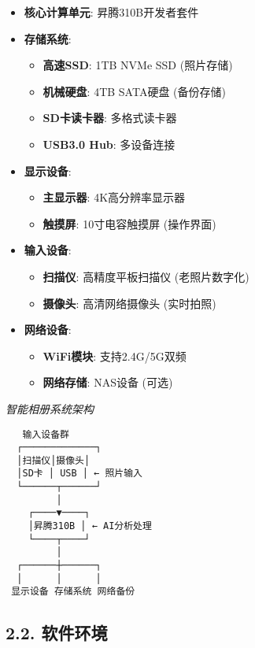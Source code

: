 \begin{itemize}
\tightlist
\item
  \textbf{核心计算单元}: 昇腾310B开发者套件
\item
  \textbf{存储系统}:

  \begin{itemize}
  \tightlist
  \item
    \textbf{高速SSD}: 1TB NVMe SSD (照片存储)
  \item
    \textbf{机械硬盘}: 4TB SATA硬盘 (备份存储)
  \item
    \textbf{SD卡读卡器}: 多格式读卡器
  \item
    \textbf{USB3.0 Hub}: 多设备连接
  \end{itemize}
\item
  \textbf{显示设备}:

  \begin{itemize}
  \tightlist
  \item
    \textbf{主显示器}: 4K高分辨率显示器
  \item
    \textbf{触摸屏}: 10寸电容触摸屏 (操作界面)
  \end{itemize}
\item
  \textbf{输入设备}:

  \begin{itemize}
  \tightlist
  \item
    \textbf{扫描仪}: 高精度平板扫描仪 (老照片数字化)
  \item
    \textbf{摄像头}: 高清网络摄像头 (实时拍照)
  \end{itemize}
\item
  \textbf{网络设备}:

  \begin{itemize}
  \tightlist
  \item
    \textbf{WiFi模块}: 支持2.4G/5G双频
  \item
    \textbf{网络存储}: NAS设备 (可选)
  \end{itemize}
\end{itemize}

\emph{智能相册系统架构}

\begin{lstlisting}
   输入设备群
  ┌─────────────┐
  │扫描仪│摄像头│
  │SD卡 │ USB │ ← 照片输入
  └──────┬──────┘
         │
    ┌────▼────┐
    │昇腾310B │ ← AI分析处理
    └────┬────┘
         │
  ┌──────┼──────┐
  │      │      │
 显示设备 存储系统 网络备份
\end{lstlisting}

\subsection{2.2. 软件环境}\label{ux8f6fux4ef6ux73afux5883}

